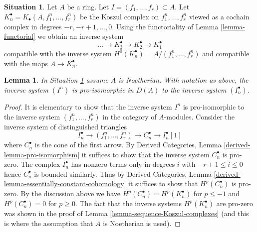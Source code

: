 \documentclass[10pt,a4paper]{amsart}
\theoremstyle{plain}
\newtheorem{lemma}[subsection]{Lemma}
\theoremstyle{definition}
\newtheorem{situation}[subsection]{Situation}
\theoremstyle{remark}
\numberwithin{equation}{subsection}
\begin{document}
\begin{situation}
\label{situation-koszul}
Let $A$ be a ring. Let $I = (f_1, \ldots, f_r) \subset A$. Let
$K_n^\bullet = K_\bullet(A, f_1^n, \ldots, f_r^n)$
be the Koszul complex on $f_1^n, \ldots, f_r^n$
viewed as a cochain complex in degrees $-r, -r + 1, \ldots, 0$.
Using the functoriality of Lemma \ref{lemma-functorial}
we obtain an inverse system
$$
\ldots \to K_3^\bullet \to K_2^\bullet \to K_1^\bullet
$$
compatible with the inverse system
$H^0(K_n^\bullet) = A/(f_1^n, \ldots, f_r^n)$
and compatible with the maps $A \to K_n^\bullet$.
\end{situation}

\begin{lemma}
\label{lemma-sequence-powers-pro-bounded}
In Situation \ref{situation-koszul} assume $A$ is Noetherian. With
notation as above, the inverse system $(I^n)$ is pro-isomorphic
in $D(A)$ to the inverse system $(I_n^\bullet)$.
\end{lemma}

\begin{proof}
It is elementary to show that the inverse system $I^n$ is pro-isomorphic
to the inverse system $(f_1^n, \ldots, f_r^n)$ in the category of $A$-modules.
Consider the inverse system of distinguished triangles
$$
I_n^\bullet \to (f_1^n, \ldots, f_r^n) \to C_n^\bullet \to I_n^\bullet[1]
$$
where $C_n^\bullet$ is the cone of the first arrow. By
Derived Categories, Lemma \ref{derived-lemma-pro-isomorphism}
it suffices to show that the inverse system $C_n^\bullet$ is pro-zero.
The complex $I_n^\bullet$ has nonzero terms only in degrees
$i$ with $-r + 1 \leq i \leq 0$ hence $C_n^\bullet$ is bounded
similarly. Thus by
Derived Categories, Lemma \ref{derived-lemma-essentially-constant-cohomology}
it suffices to show that $H^p(C_n^\bullet)$ is pro-zero. By the discussion
above we have $H^p(C_n^\bullet) = H^p(K_n^\bullet)$ for $p \leq -1$ and
$H^p(C_n^\bullet) = 0$ for $p \geq 0$.
The fact that the inverse systems $H^p(K_n^\bullet)$ are pro-zero
was shown in the proof of Lemma \ref{lemma-sequence-Koszul-complexes}
(and this is where the assumption that $A$ is Noetherian is used).
\end{proof}
\end{document}

